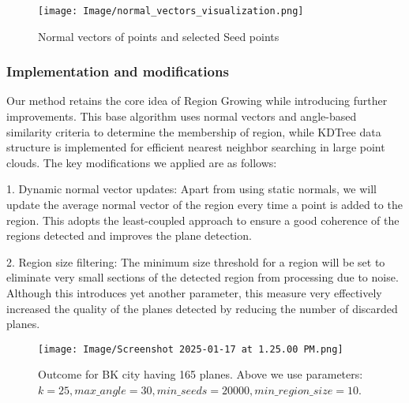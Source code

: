\documentclass[a4paper,9pt]{article}
\begin{document}
\begin{figure}[H]
    \centering
    \texttt{[image: Image/normal\_vectors\_visualization.png]}
    \caption{ Normal vectors of points and selected Seed points}
    \label{fig:1-1}
\end{figure}

\subsubsection{Implementation and modifications}
Our method retains the core idea of Region Growing while introducing further improvements. This base algorithm uses normal vectors and angle-based similarity criteria to determine the membership of region, while KDTree data structure is implemented for efficient nearest neighbor searching in large point clouds. The key modifications we applied are as follows:

1. Dynamic normal vector updates: Apart from using static normals, we will update the average normal vector of the region every time a point is added to the region. This adopts the least-coupled approach to ensure a good coherence of the regions detected and improves the plane detection.

2. Region size filtering: The minimum size threshold for a region will be set to eliminate very small sections of the detected region from processing due to noise. Although this introduces yet another parameter, this measure very effectively increased the quality of the planes detected by reducing the number of discarded planes.  

\begin{figure}[H]
    \centering
    \texttt{[image: Image/Screenshot 2025-01-17 at 1.25.00 PM.png]}
    \caption{ Outcome for BK city having 165 planes. Above we use parameters: $k = 25,
max\_angle = 30, min\_seeds = 20000, min\_region\_size = 10$.}
    \label{fig:1-1}
\end{figure}
\end{document}

